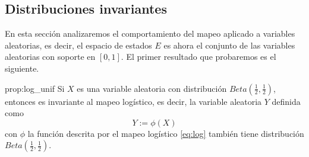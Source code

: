 \documentclass[../Main.tex]{subfiles}
\begin{document}
\subsection{Distribuciones invariantes}
En esta sección analizaremos el comportamiento del mapeo aplicado a variables aleatorias, es decir, el espacio de estados $E$ es ahora el conjunto de las variables aleatorias con soporte en $[0,1]$. El primer resultado que probaremos es el siguiente. 
\begin{proposition}{}{prop:log_unif}
Si $X$ es una variable aleatoria con distribución $Beta\left(\frac{1}{2},\frac{1}{2}\right)$, entonces es invariante al mapeo logístico, es decir, la variable aleatoria $Y$ definida como  $$Y:=\phi(X)$$ con $\phi$ la función descrita por el mapeo logístico \ref{eq:log} también tiene distribución $Beta\left(\frac{1}{2},\frac{1}{2}\right)$.
\end{proposition}
\end{document}
